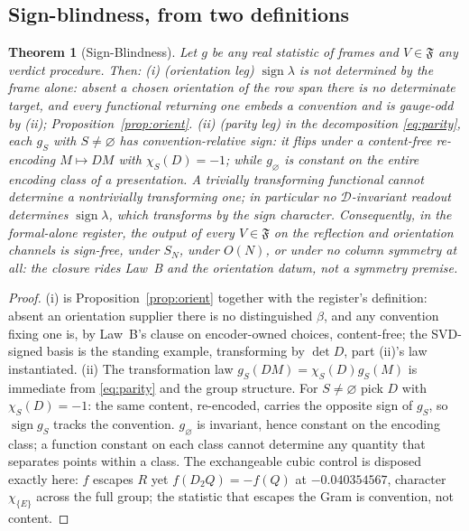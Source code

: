 \documentclass[twocolumn,10pt]{article}
\theoremstyle{plain}
\newtheorem{theorem}{Theorem}[section]
\theoremstyle{definition}
\newcommand{\Fr}{\mathfrak{F}}
\begin{document}
\subsection{Sign-blindness, from two definitions}
\begin{theorem}[Sign-Blindness]\label{thm:signblind}
Let $g$ be any real statistic of frames and $V\in\Fr$ any verdict procedure. Then:
\emph{(i)} (orientation leg) $\operatorname{sign}\lambda$ is not determined by the frame alone: absent a chosen orientation of the row span there is no determinate target, and every functional returning one embeds a convention and is gauge-odd by (ii); Proposition~\ref{prop:orient}.
\emph{(ii)} (parity leg) in the decomposition \eqref{eq:parity}, each $g_S$ with $S\ne\varnothing$ has convention-relative sign: it flips under a content-free re-encoding $M\mapsto DM$ with $\chi_S(D)=-1$; while $g_\varnothing$ is constant on the entire encoding class of a presentation. A trivially transforming functional cannot determine a nontrivially transforming one; in particular no $\mathcal D$-invariant readout determines $\operatorname{sign}\lambda$, which transforms by the sign character.
Consequently, in the formal-alone register, the output of every $V\in\Fr$ on the reflection and orientation channels is sign-free, under $S_N$, under $O(N)$, or under no column symmetry at all: the closure rides Law~B and the orientation datum, not a symmetry premise.
\end{theorem}
\begin{proof}
(i) is Proposition~\ref{prop:orient} together with the register's definition: absent an orientation supplier there is no distinguished $\beta$, and any convention fixing one is, by Law~B's clause on encoder-owned choices, content-free; the SVD-signed basis is the standing example, transforming by $\det D$, part (ii)'s law instantiated. (ii) The transformation law $g_S(DM)=\chi_S(D)g_S(M)$ is immediate from \eqref{eq:parity} and the group structure. For $S\ne\varnothing$ pick $D$ with $\chi_S(D)=-1$: the same content, re-encoded, carries the opposite sign of $g_S$, so $\operatorname{sign}g_S$ tracks the convention. $g_\varnothing$ is invariant, hence constant on the encoding class; a function constant on each class cannot determine any quantity that separates points within a class. The exchangeable cubic control is disposed exactly here: $f$ escapes $R$ yet $f(D_2Q)=-f(Q)$ at $-0.040354567$, character $\chi_{\{E\}}$ across the full group; the statistic that escapes the Gram is convention, not content.
\end{proof}
\end{document}
